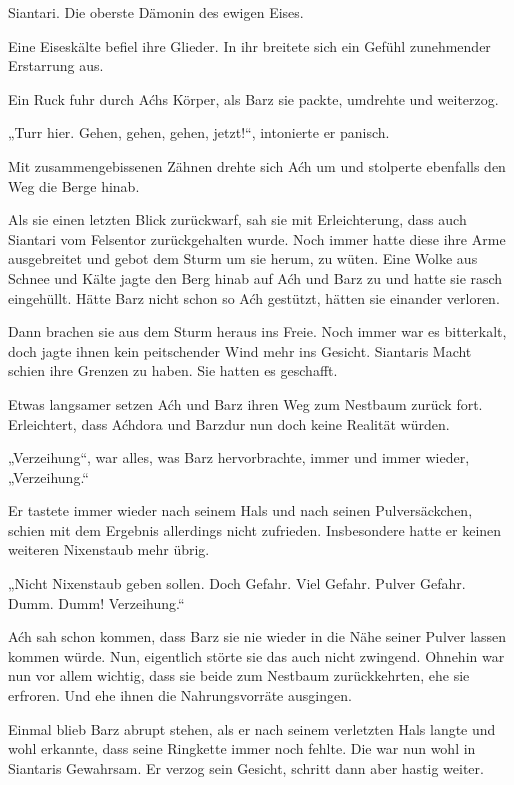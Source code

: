 Siantari. Die oberste Dämonin des ewigen Eises.

Eine Eiseskälte befiel ihre Glieder. In ihr breitete sich ein Gefühl zunehmender Erstarrung aus.

Ein Ruck fuhr durch Aćhs Körper, als Barz sie packte, umdrehte und weiterzog.

„Turr hier. Gehen, gehen, gehen, jetzt!“, intonierte er panisch.

Mit zusammengebissenen Zähnen drehte sich Aćh um und stolperte ebenfalls den Weg die Berge hinab.

Als sie einen letzten Blick zurückwarf, sah sie mit Erleichterung, dass auch Siantari vom Felsentor zurückgehalten wurde. Noch immer hatte diese ihre Arme ausgebreitet und gebot dem Sturm um sie herum, zu wüten. Eine Wolke aus Schnee und Kälte jagte den Berg hinab auf Aćh und Barz zu und hatte sie rasch eingehüllt. Hätte Barz nicht schon so Aćh gestützt, hätten sie einander verloren.

Dann brachen sie aus dem Sturm heraus ins Freie. Noch immer war es bitterkalt, doch jagte ihnen kein peitschender Wind mehr ins Gesicht. Siantaris Macht schien ihre Grenzen zu haben. Sie hatten es geschafft.



\trennzeichen



Etwas langsamer setzen Aćh und Barz ihren Weg zum Nestbaum zurück fort. Erleichtert, dass Aćhdora und Barzdur nun doch keine Realität würden.

„Verzeihung“, war alles, was Barz hervorbrachte, immer und immer wieder, „Verzeihung.“

Er tastete immer wieder nach seinem Hals und nach seinen Pulversäckchen, schien mit dem Ergebnis allerdings nicht zufrieden. Insbesondere hatte er keinen weiteren Nixenstaub mehr übrig.

„Nicht Nixenstaub geben sollen. Doch Gefahr. Viel Gefahr. Pulver Gefahr. Dumm. Dumm! Verzeihung.“

Aćh sah schon kommen, dass Barz sie nie wieder in die Nähe seiner Pulver lassen kommen würde. Nun, eigentlich störte sie das auch nicht zwingend. Ohnehin war nun vor allem wichtig, dass sie beide zum Nestbaum zurückkehrten, ehe sie erfroren. Und ehe ihnen die Nahrungsvorräte ausgingen.

Einmal blieb Barz abrupt stehen, als er nach seinem verletzten Hals langte und wohl erkannte, dass seine Ringkette immer noch fehlte. Die war nun wohl in Siantaris Gewahrsam. Er verzog sein Gesicht, schritt dann aber hastig weiter.


